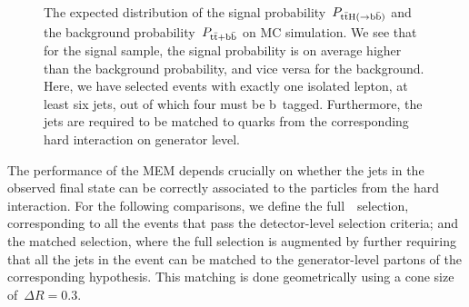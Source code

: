 \begin{figure}[ht]
\begin{centering}
\\
\caption[The distributions of the MEM signal and background probabilities]{The expected distribution of the signal probability~$P_{\mathrm{t} \bar{\mathrm{t}} \mathrm{H} (\rightarrow \mathrm{b}\bar{\mathrm{b}})}$ and the background probability~$P_{\mathrm{t} \bar{\mathrm{t}} + \mathrm{b}\bar{\mathrm{b}}}$ on MC simulation. We see that for the signal sample, the signal probability is on average higher than the background probability, and vice versa for the background. Here, we have selected events with exactly one isolated lepton, at least six jets, out of which four must be b~tagged. Furthermore, the jets are required to be matched to quarks from the corresponding hard interaction on generator level.}
\label{fig:mem_proba}
\end{centering}
\end{figure}

The performance of the MEM depends crucially on whether the jets in the observed final state can be correctly associated to the particles from the hard interaction. For the following comparisons, we define the full~\ttHbb~selection, corresponding to all the events that pass the detector-level selection criteria; and the matched selection, where the full selection is augmented by further requiring that all the jets in the event can be matched to the generator-level partons of the corresponding hypothesis. This matching is done geometrically using a cone size of~$\Delta R = 0.3$.

